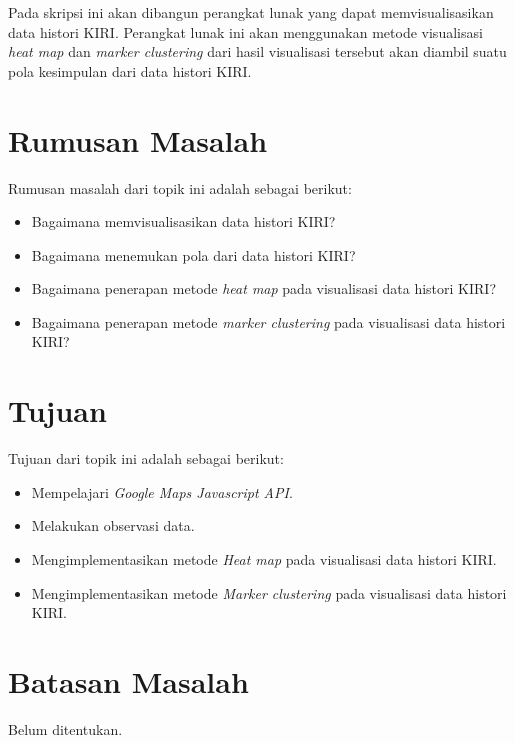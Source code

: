 Pada skripsi ini akan dibangun perangkat lunak yang dapat memvisualisasikan data histori KIRI. Perangkat lunak ini akan menggunakan metode visualisasi \textit{heat map} dan \textit{marker clustering} dari hasil visualisasi tersebut akan diambil suatu pola kesimpulan dari data histori KIRI.


\section{Rumusan Masalah}
\label{sec:rumusan}
Rumusan masalah dari topik ini adalah sebagai berikut:
\begin{itemize}
  \item Bagaimana memvisualisasikan data histori KIRI?
  \item Bagaimana menemukan pola dari data histori KIRI?
  \item Bagaimana penerapan metode \textit{heat map} pada visualisasi data histori KIRI?
  \item Bagaimana penerapan metode \textit{marker clustering} pada visualisasi data histori KIRI?


\end{itemize}

\section{Tujuan}
\label{sec:tujuan}
Tujuan dari topik ini adalah sebagai berikut:
\begin{itemize}
  \item Mempelajari \textit{Google Maps Javascript API}.
  \item Melakukan observasi data.
  \item Mengimplementasikan metode \textit{Heat map} pada visualisasi data histori KIRI.
  \item Mengimplementasikan metode \textit{Marker clustering} pada visualisasi data histori KIRI.


\end{itemize}

\section{Batasan Masalah}
\label{sec:batasan}
Belum ditentukan.

